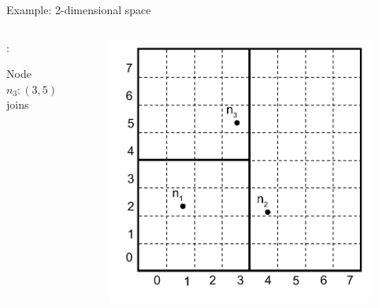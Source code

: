 \begin{frame}{Example: 2-dimensional space}

\begin{columns}
\begin{column}{0.5\textwidth}
:\\
\BI
\item Node $n_3:(3, 5)$ joins
\EI
\end{column}
\begin{column}{0.5\textwidth}
\begin{figure}
	\includegraphics[width=1.0\textwidth]{can3}
\end{figure}
\end{column}
\end{columns}
		
\end{frame}	

